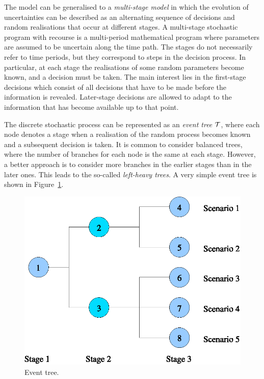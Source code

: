 The model can be generalised to a {\em multi-stage model} in which 
the evolution of uncertainties can be 
described as an alternating sequence of decisions and random 
realisations that occur at different stages.
A multi-stage stochastic program with recourse is a multi-period 
mathematical program where parameters are assumed to be uncertain 
along the time path.
The stages do not necessarily refer to time periods, but they correspond
to steps in the decision process. In particular, at each stage the
realisations of some random parameters become known, and a decision
must be taken.
The main interest lies in the 
first-stage decisions which consist of all decisions that have to
be made before the information is revealed. Later-stage decisions 
are allowed to adapt to the information that has become available 
up to that point.

The discrete stochastic process can be represented as an 
{\em event tree} $\mathcal{T}$,
where each node denotes a stage when a realisation 
of the random process becomes known and a subsequent decision is taken.
It is common to consider balanced trees, where the number of
branches for each node is the same at each stage.
However, a better approach is to consider more branches in the
earlier stages than in the later ones. This leads to the
so-called {\em left-heavy trees}.
A very simple event tree is shown in Figure~\ref{fig:EventTree}.
%
\begin{figure}[ht]
  \begin{center}
    \includegraphics[scale=0.6]{figures/tree.eps}
    \caption{Event tree.}
    \label{fig:EventTree}
  \end{center}
  \vspace{-3ex}
\end{figure}

